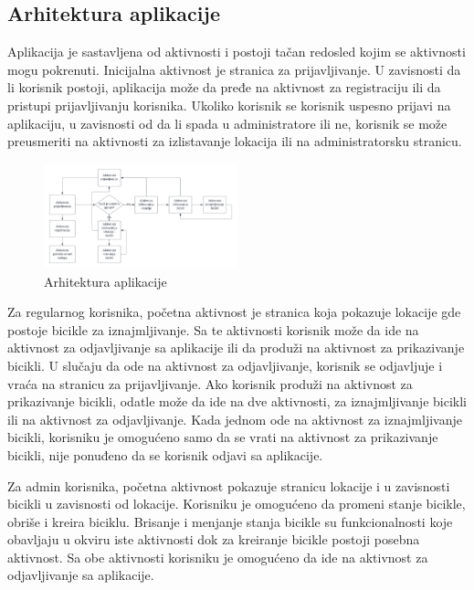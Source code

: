 \documentclass[12pt,oneside]{memoir}
\begin{document}
\subsection{Arhitektura aplikacije}
 
Aplikacija je sastavljena od aktivnosti i postoji tačan redosled kojim se aktivnosti mogu pokrenuti. Inicijalna aktivnost je stranica za prijavljivanje. U zavisnosti da li korisnik postoji, aplikacija može da pređe na aktivnost za registraciju ili da pristupi prijavljivanju korisnika. Ukoliko korisnik se korisnik uspesno prijavi na aplikaciju, u zavisnosti od da li spada u administratore ili ne, korisnik se može preusmeriti na aktivnosti za izlistavanje lokacija ili na administratorsku stranicu.
 
\begin{figure}[!ht]
  \centering
  \includegraphics[width=0.5\textwidth]{Organizacija aktivnosti.png}
  \caption{Arhitektura aplikacije}
  \label{fig:arhitekturaApplikacije}
\end{figure}
 
Za regularnog korisnika, početna aktivnost je stranica koja pokazuje lokacije gde postoje bicikle za iznajmljivanje. Sa te aktivnosti korisnik može da ide na aktivnost za odjavljivanje sa aplikacije ili da produži na aktivnost za prikazivanje bicikli. U slučaju da ode na aktivnost za odjavljivanje, korisnik se odjavljuje i vraća na stranicu za prijavljivanje. Ako korisnik produži na aktivnost za prikazivanje bicikli, odatle može da ide na dve aktivnosti, za iznajmljivanje bicikli ili na aktivnost za odjavljivanje. Kada jednom ode na aktivnost za iznajmljivanje bicikli, korisniku je omogućeno samo da se vrati na aktivnost za prikazivanje bicikli, nije ponuđeno da se korisnik odjavi sa aplikacije.
 
Za admin korisnika, početna aktivnost pokazuje stranicu lokacije i u zavisnosti bicikli u zavisnosti od lokacije. Korisniku je omogućeno da promeni stanje bicikle, obriše i kreira biciklu. Brisanje i menjanje stanja bicikle su funkcionalnosti koje obavljaju u okviru iste aktivnosti dok za kreiranje bicikle postoji posebna aktivnost. Sa obe aktivnosti korisniku je omogućeno da ide na aktivnost za odjavljivanje sa aplikacije.
 
\end{document}
